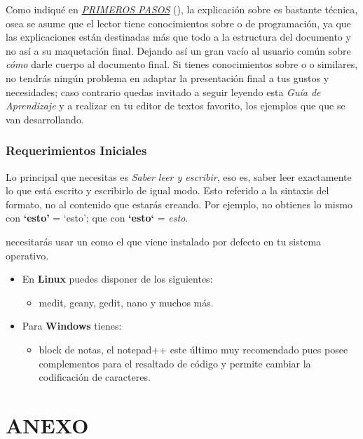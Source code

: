 \documentclass[letterpaper,10pt,spanish]{sphinxmanual}
\begin{document}
Como indiqué en {\hyperref[parte01:primeros\string-pasos]{\emph{PRIMEROS PASOS}}} (), la explicación sobre  es bastante técnica, osea se asume que el lector tiene conocimientos sobre  o de programación, ya que las explicaciones están destinadas más que todo a la estructura del documento y no así a su maquetación final. Dejando así un gran vacío al usuario común sobre \emph{cómo} darle cuerpo al documento final. Si tienes conocimientos sobre  o  o similares, no tendrás ningún problema en adaptar la presentación final a tus gustos y necesidades; caso contrario quedas invitado a seguir leyendo esta \emph{Guía de Aprendizaje} y a realizar en tu editor de textos favorito, los ejemplos que  que se van desarrollando.


\section{Requerimientos Iniciales}
\label{parte01:id7}\label{parte01:requerimientos-iniciales}
Lo principal que necesitas es \emph{Saber leer y escribir}, eso es, saber leer exactamente lo que está escrito y escribirlo de igual modo. Esto referido a la sintaxis del formato, no al contenido que estarás creando. Por ejemplo, no obtienes lo mismo con \textbf{`esto'} = `esto'; que con \textbf{{}`esto{}`} = \emph{esto}.

necesitarás usar un  como el que viene instalado por defecto en tu sistema operativo.
\begin{itemize}
\item {} 
En \textbf{Linux} puedes disponer de los siguientes:
\begin{itemize}
\item {} 
medit, geany, gedit, nano y muchos más.

\end{itemize}

\item {} 
Para \textbf{Windows} tienes:
\begin{itemize}
\item {} 
block de notas, el notepad++ este último muy recomendado pues posee complementos para el resaltado de código y permite cambiar la codificación de caracteres.

\end{itemize}

\end{itemize}


\part{ANEXO}
\label{anexo:anexo}\label{anexo::doc}\label{anexo:id1}
\end{document}
